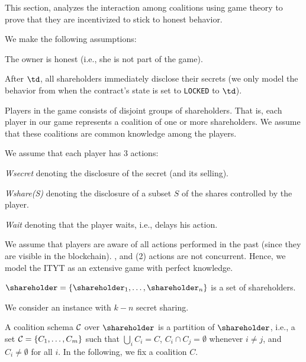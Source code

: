 This section, analyzes the interaction among coalitions using game theory to prove that they are incentivized to stick to honest behavior.

%
We make the following assumptions:
\begin{compactenum} 
\item The owner is honest (i.e., she is not part of the game).

\item After $\td$, all shareholders immediately disclose their secrets (we only model the behavior from when the contract's state is set to \texttt{LOCKED} to $\td$).

\item Players in the game consists of disjoint groups of shareholders.
%
That is, each player in our game represents a coalition of one or more shareholders.
%
We assume that these coalitions are common knowledge among the players.

\item We assume that each player has 3 actions: 
\begin{compactitem}
\item \textit{Wsecret} denoting the disclosure of the secret (and its selling).
\item \textit{Wshare(S)} denoting the disclosure of a subset $S$ of the shares controlled by the player.
\item \textit{Wait} denoting that the player waits, i.e., delays his action.
\end{compactitem}

\item We assume that players are aware of all actions performed in the past (since they are visible in the blockchain). , and (2) actions are not concurrent.
%
Hence, we model the ITYT as an extensive game with perfect knowledge. 

\end{compactenum}

%
$\shareholder = \{\shareholder_1, \ldots, \shareholder_n\}$ is a set of shareholders.

%
We consider an \shortname instance with $k-n$ secret sharing.

%
A coalition schema $\mathcal{C}$ over $\shareholder$ is a partition of $\shareholder$, i.e., a set $\mathcal{C} = \{ C_1, \ldots, C_m\}$ such that $\bigcup_{i}C_i = C$, $C_i \cap C_j = \emptyset$ whenever $i \neq j$, and $C_i \neq \emptyset$ for all $i$.
%
In the following, we fix a coalition $C$.


